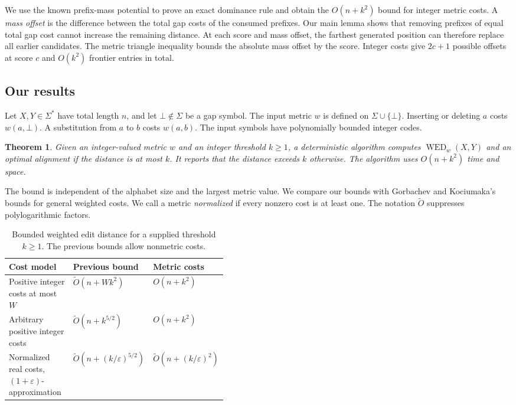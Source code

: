 \documentclass[11pt]{article}
\newtheorem{theorem}{Theorem}[section]
\theoremstyle{remark}
\newcommand{\WED}{\operatorname{WED}}
\newcommand{\gap}{\bot}
\newcommand{\eps}{\varepsilon}
\newcommand{\softO}{\widetilde O}
\begin{document}
We use the known prefix-mass potential to prove an exact dominance rule
and obtain the $O(n+k^2)$ bound for integer metric costs. A \emph{mass
offset} is the difference between the total gap costs of the consumed prefixes.
Our main lemma shows that removing prefixes of equal total gap cost
cannot increase the remaining distance.
At each score and mass offset, the farthest generated position can
therefore replace all earlier candidates. The metric triangle inequality
bounds the absolute mass offset by the score. Integer costs give
$2c+1$ possible offsets at score $c$ and $O(k^2)$ frontier entries in total.

\subsection{Our results}\label{sec:results}

Let $X,Y\in\Sigma^*$ have total length $n$, and let
$\gap\notin\Sigma$ be a gap symbol. The input metric $w$ is defined
on $\Sigma\cup\{\gap\}$. Inserting or deleting $a$ costs
$w(a,\gap)$. A substitution from $a$ to $b$ costs $w(a,b)$.
The input symbols have polynomially bounded integer codes.

\begin{theorem}\label{thm:integer}
Given an integer-valued metric $w$ and an integer threshold $k\ge1$,
a deterministic algorithm computes $\WED_w(X,Y)$ and an optimal
alignment if the distance is at most $k$. It reports that the distance
exceeds $k$ otherwise. The algorithm uses $O(n+k^2)$ time and space.
\end{theorem}

The bound is independent of the alphabet size and the largest metric
value.
We compare our bounds with Gorbachev and Kociumaka's bounds for general
weighted costs. We call a metric \emph{normalized}
if every nonzero cost is at least one. The notation $\softO$ suppresses
polylogarithmic factors.

\begin{table}[H]
\centering
\begin{tabular}{@{}>{\raggedright\arraybackslash}p{0.43\linewidth}ll@{}}
\toprule
Cost model & Previous bound & Metric costs\\
\midrule
Positive integer costs at most $W$
 & $\softO(n+Wk^2)$ & $O(n+k^2)$\\
Arbitrary positive integer costs
 & $\softO(n+k^{5/2})$ & $O(n+k^2)$\\
Normalized real costs, $(1+\eps)$-approximation
 & $\softO(n+(k/\eps)^{5/2})$
 & $\softO(n+(k/\eps)^2)$\\
\bottomrule
\end{tabular}
\caption{Bounded weighted edit distance for a supplied threshold $k\ge1$.
The previous bounds allow nonmetric costs.}
\label{tab:comparison}
\end{table}
\end{document}
